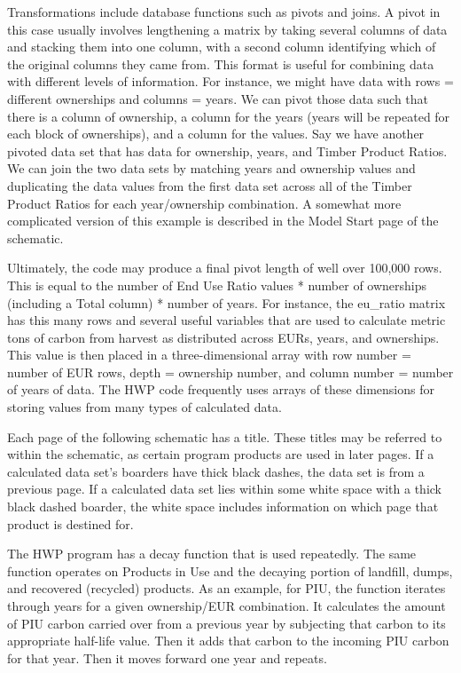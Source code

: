 \documentclass[
  openany]{book}
\begin{document}
Transformations include database functions such as pivots and joins. A
pivot in this case usually involves lengthening a matrix by taking
several columns of data and stacking them into one column, with a second
column identifying which of the original columns they came from. This
format is useful for combining data with different levels of
information. For instance, we might have data with rows = different
ownerships and columns = years. We can pivot those data such that there
is a column of ownership, a column for the years (years will be repeated
for each block of ownerships), and a column for the values. Say we have
another pivoted data set that has data for ownership, years, and Timber
Product Ratios. We can join the two data sets by matching years and
ownership values and duplicating the data values from the first data set
across all of the Timber Product Ratios for each year/ownership
combination. A somewhat more complicated version of this example is
described in the Model Start page of the schematic.

Ultimately, the code may produce a final pivot length of well over
100,000 rows. This is equal to the number of End Use Ratio values *
number of ownerships (including a Total column) * number of years. For
instance, the eu\_ratio matrix has this many rows and several useful
variables that are used to calculate metric tons of carbon from harvest
as distributed across EURs, years, and ownerships. This value is then
placed in a three-dimensional array with row number = number of EUR
rows, depth = ownership number, and column number = number of years of
data. The HWP code frequently uses arrays of these dimensions for
storing values from many types of calculated data.

Each page of the following schematic has a title. These titles may be
referred to within the schematic, as certain program products are used
in later pages. If a calculated data set's boarders have thick black
dashes, the data set is from a previous page. If a calculated data set
lies within some white space with a thick black dashed boarder, the
white space includes information on which page that product is destined
for.

The HWP program has a decay function that is used repeatedly. The same
function operates on Products in Use and the decaying portion of
landfill, dumps, and recovered (recycled) products. As an example, for
PIU, the function iterates through years for a given ownership/EUR
combination. It calculates the amount of PIU carbon carried over from a
previous year by subjecting that carbon to its appropriate half-life
value. Then it adds that carbon to the incoming PIU carbon for that
year. Then it moves forward one year and repeats.
\end{document}
